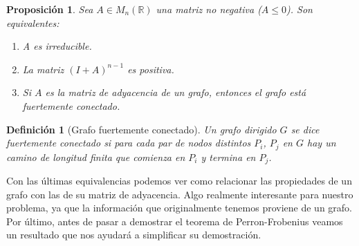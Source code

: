 \documentclass[size=a4, parskip=half, titlepage=false, toc=flat, toc=bib, 12pt]{scrartcl}
\theoremstyle{theorem-style}
\newtheorem{nprop}{Proposición}[section]
\theoremstyle{definition-style}
\newtheorem{ndef}{Definición}[section]
\theoremstyle{remark-style}
\theoremstyle{example-style}
\theoremstyle{definition-style}
\theoremstyle{remark-style}
\begin{document}
\begin{nprop}
\label{irreducible}
\label{positiva}
Sea $A \in M_n(\mathbb{R})$ una matriz no negativa ($A \leq 0$). Son equivalentes:
\begin{enumerate}
\item A es irreducible.
\item La matriz $(I + A)^{n - 1}$ es positiva.
\item Si $A$ es la matriz de adyacencia de un grafo, entonces el grafo está fuertemente conectado.
\end{enumerate}
\end{nprop}

\begin{ndef}[Grafo fuertemente conectado]
Un grafo dirigido $G$ se dice fuertemente conectado si para cada par de nodos distintos $P_i$, $P_j$ en $G$ hay un camino de longitud finita que comienza en $P_i$ y termina en $P_j$.
\end{ndef}

Con las últimas equivalencias podemos ver como relacionar las propiedades de un grafo con las de su matriz de adyacencia. Algo realmente interesante para nuestro problema, ya que la información que originalmente tenemos proviene de un grafo. Por último, antes de pasar a demostrar el teorema de Perron-Frobenius veamos un resultado que nos ayudará a simplificar su demostración.
\end{document}
